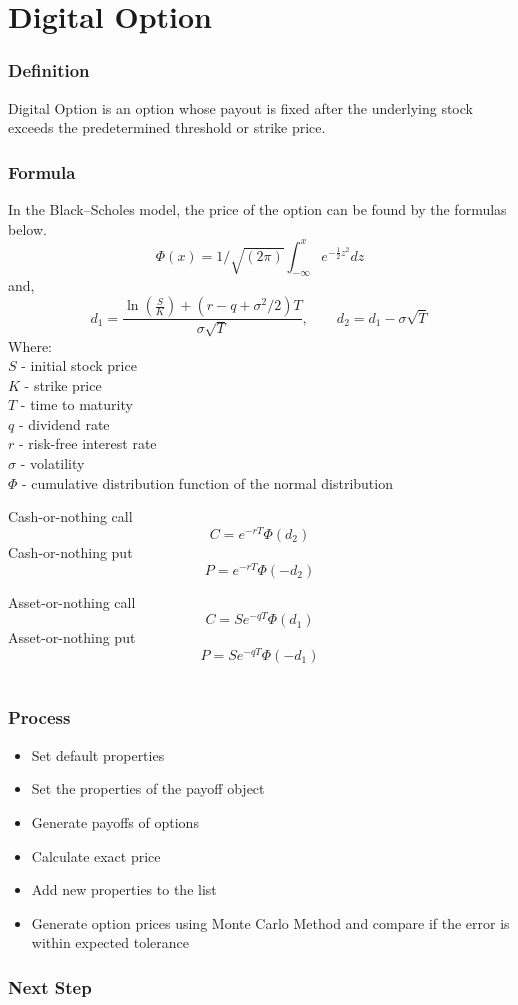 \documentclass[10pt,Compress]{beamer}
\begin{document}
\section{Digital Option}
\begin{frame}
\frametitle{Definition}
Digital Option is an option whose payout is fixed after the underlying stock exceeds the predetermined threshold or strike price. 
\end{frame}



\begin{frame}
\frametitle{Formula}
In the Black–Scholes model, the price of the option can be found by the formulas below.
$$\Phi(x)=1/\sqrt{(2\pi)}\int_{-\infty}^{x}e^{-\frac{1}{2}z^2}dz$$
and,
$$d_1=\frac{\ln(\frac{S}{K})+(r-q+\sigma^2/2)T}{\sigma\sqrt{T}},\quad\quad d_2=d_1-\sigma\sqrt{T}$$
Where:\\
$S$ - initial stock price\\
$K$ - strike price\\
$T$ - time to maturity\\
$q$ - dividend rate\\
$r$ - risk-free interest rate\\
$\sigma$ - volatility\\
$\Phi$ - cumulative distribution function of the normal distribution
\end{frame}

\begin{frame}
Cash-or-nothing call\\
$$C=e^{-rT}\Phi(d_2)$$
Cash-or-nothing put\\
$$P=e^{-rT}\Phi(-d_2)$$

Asset-or-nothing call\\
$$C=Se^{-qT}\Phi(d_1)$$
Asset-or-nothing put\\
$$P=Se^{-qT}\Phi(-d_1)$$
\\
\end{frame}

\begin{frame}
\frametitle{Process}
\begin{itemize}
\item Set default properties
\item Set the properties of the payoff object
\item Generate payoffs of options
\item Calculate exact price
\item Add new properties to the list 
\item Generate option prices using Monte Carlo Method and compare if the error is within expected tolerance
\end{itemize}
\end{frame}


\begin{frame}
\frametitle{Next Step}

\end{frame}
\end{document}
